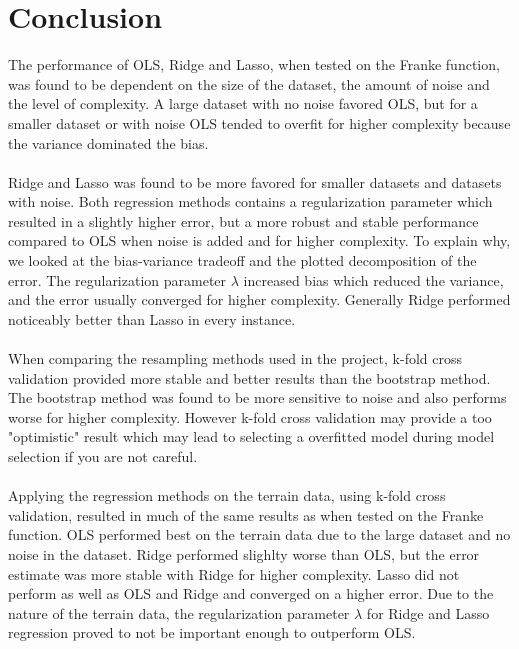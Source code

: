 \documentclass[a4paper,twocolumn]{article}
\begin{document}
\section{Conclusion}
The performance of OLS, Ridge and Lasso, when tested on the Franke function, was found to be dependent on the size of the dataset, the amount of noise and the level of complexity. A large dataset with no noise favored OLS, but for a smaller dataset or with noise OLS tended to overfit for higher complexity because the variance dominated the bias.\\
\\
Ridge and Lasso was found to be more favored for smaller datasets and datasets with noise. Both regression methods contains a regularization parameter which resulted in a slightly higher error, but a more robust and stable performance compared to OLS when noise is added and for higher complexity. To explain why, we looked at the bias-variance tradeoff and the plotted decomposition of the error. The regularization parameter $\lambda$ increased bias which reduced the variance, and the error usually converged for higher complexity. Generally Ridge performed noticeably better than Lasso in every instance.\\
\\
When comparing the resampling methods used in the project, k-fold cross validation provided more stable and better results than the bootstrap method. The bootstrap method was found to be more sensitive to noise and also performs worse for higher complexity. However k-fold cross validation may provide a too "optimistic" result which may lead to selecting a overfitted model during model selection if you are not careful.\\
\\
Applying the regression methods on the terrain data, using k-fold cross validation, resulted in much of the same results as when tested on the Franke function. OLS performed best on the terrain data due to the large dataset and no noise in the dataset. Ridge performed slighlty worse than OLS, but the error estimate was more stable with Ridge for higher complexity. Lasso did not perform as well as OLS and Ridge and converged on a higher error. Due to the nature of the terrain data, the regularization parameter $\lambda$ for Ridge and Lasso regression proved to not be important enough to outperform OLS.
\end{document}
